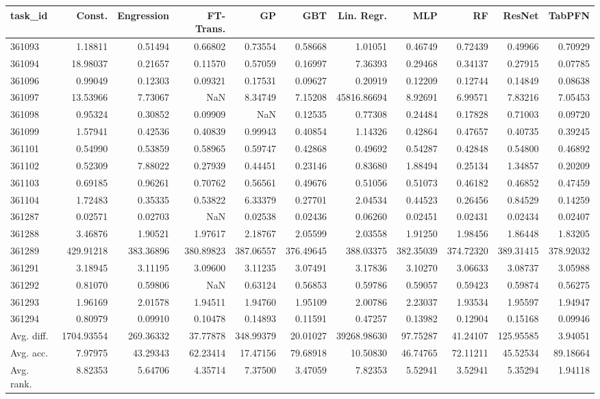\begin{tabular}{lrrrrrrrrrr}
\toprule
task\_id & Const. & Engression & FT-Trans. & GP & GBT & Lin. Regr. & MLP & RF & ResNet & TabPFN \\
\midrule
361093 & 1.18811 & 0.51494 & 0.66802 & 0.73554 & 0.58668 & 1.01051 & 0.46749 & 0.72439 & 0.49966 & 0.70929 \\
361094 & 18.98037 & 0.21657 & 0.11570 & 0.57059 & 0.16997 & 7.36393 & 0.29468 & 0.34137 & 0.27915 & 0.07785 \\
361096 & 0.99049 & 0.12303 & 0.09321 & 0.17531 & 0.09627 & 0.20919 & 0.12209 & 0.12744 & 0.14849 & 0.08638 \\
361097 & 13.53966 & 7.73067 & NaN & 8.34749 & 7.15208 & 45816.86694 & 8.92691 & 6.99571 & 7.83216 & 7.05453 \\
361098 & 0.95324 & 0.30852 & 0.09909 & NaN & 0.12535 & 0.77308 & 0.24484 & 0.17828 & 0.71003 & 0.09720 \\
361099 & 1.57941 & 0.42536 & 0.40839 & 0.99943 & 0.40854 & 1.14326 & 0.42864 & 0.47657 & 0.40735 & 0.39245 \\
361101 & 0.54990 & 0.53859 & 0.58965 & 0.59747 & 0.42868 & 0.49692 & 0.54287 & 0.42848 & 0.54800 & 0.46892 \\
361102 & 0.52309 & 7.88022 & 0.27939 & 0.44451 & 0.23146 & 0.83680 & 1.88494 & 0.25134 & 1.34857 & 0.20209 \\
361103 & 0.69185 & 0.96261 & 0.70762 & 0.56561 & 0.49676 & 0.51056 & 0.51073 & 0.46182 & 0.46852 & 0.47459 \\
361104 & 1.72483 & 0.35335 & 0.53822 & 6.33379 & 0.27701 & 2.04534 & 0.44523 & 0.26456 & 0.84529 & 0.14259 \\
361287 & 0.02571 & 0.02703 & NaN & 0.02538 & 0.02436 & 0.06260 & 0.02451 & 0.02431 & 0.02434 & 0.02407 \\
361288 & 3.46876 & 1.90521 & 1.97617 & 2.18767 & 2.05599 & 2.03558 & 1.91250 & 1.98456 & 1.86448 & 1.83205 \\
361289 & 429.91218 & 383.36896 & 380.89823 & 387.06557 & 376.49645 & 388.03375 & 382.35039 & 374.72320 & 389.31415 & 378.92032 \\
361291 & 3.18945 & 3.11195 & 3.09600 & 3.11235 & 3.07491 & 3.17836 & 3.10270 & 3.06633 & 3.08737 & 3.05988 \\
361292 & 0.81070 & 0.59806 & NaN & 0.63124 & 0.56853 & 0.59786 & 0.59057 & 0.59423 & 0.59874 & 0.56275 \\
361293 & 1.96169 & 2.01578 & 1.94511 & 1.94760 & 1.95109 & 2.00786 & 2.23037 & 1.93534 & 1.95597 & 1.94947 \\
361294 & 0.80979 & 0.09910 & 0.10478 & 0.14893 & 0.11591 & 0.47257 & 0.13982 & 0.12904 & 0.15168 & 0.09946 \\
Avg. diff. & 1704.93554 & 269.36332 & 37.77878 & 348.99379 & 20.01027 & 39268.98630 & 97.75287 & 41.24107 & 125.95585 & 3.94051 \\
Avg. acc. & 7.97975 & 43.29343 & 62.23414 & 17.47156 & 79.68918 & 10.50830 & 46.74765 & 72.11211 & 45.52534 & 89.18664 \\
Avg. rank. & 8.82353 & 5.64706 & 4.35714 & 7.37500 & 3.47059 & 7.82353 & 5.52941 & 3.52941 & 5.35294 & 1.94118 \\
\bottomrule
\end{tabular}
